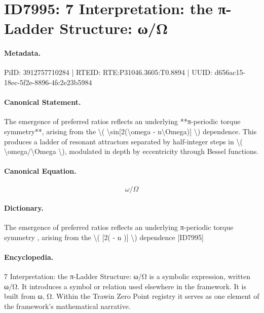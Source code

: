 \section*{ID7995: 7 Interpretation: the π-Ladder Structure: ω/Ω}
\paragraph{Metadata.}
PiID: 3912757710284 | RTEID: RTE:P31046.3605:T0.8894 | UUID: d656ac15-18ec-5f2e-8896-4fc2e23b5984

\paragraph{Canonical Statement.}
The emergence of preferred ratios reflects an underlying **π-periodic torque symmetry**, arising from the \textbackslash{}( \textbackslash{}sin[2(\textbackslash{}omega - n\textbackslash{}Omega)] \textbackslash{}) dependence. This produces a ladder of resonant attractors separated by half-integer steps in \textbackslash{}( \textbackslash{}omega/\textbackslash{}Omega \textbackslash{}), modulated in depth by eccentricity through Bessel functions.

\paragraph{Canonical Equation.}
\[
\omega/\Omega
\]

\paragraph{Dictionary.}
The emergence of preferred ratios reflects an underlying π-periodic torque symmetry , arising from the \textbackslash{}( [2( - n )] \textbackslash{}) dependence [ID7995]

\paragraph{Encyclopedia.}
7 Interpretation: the π-Ladder Structure: ω/Ω is a symbolic expression, written ω/Ω. It introduces a symbol or relation used elsewhere in the framework. It is built from ω, Ω. Within the Trawin Zero Point registry it serves as one element of the framework's mathematical narrative.
